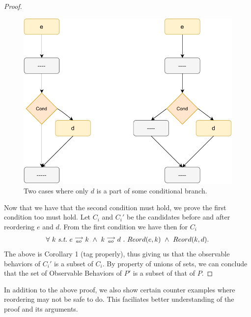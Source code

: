\begin{proof}
\begin{itemize}
                    \begin{figure}[H]
                        \centering 
                        \includegraphics[scale=0.7]{InstructionReordering/ConditionalsProofFig3.pdf}
                        \caption{Two cases where only $d$ is a part of some conditional branch.}
                    \end{figure}

            \end{itemize}

            Now that we have that the second condition must hold, we prove the first condition too must hold. Let $C_i$ and $C_i'$ be the candidates before and after reordering $e$ and $d$. From the first condition we have then for $C_i$
            \begin{align*}
                \forall \ k \ \textit{s.t.} \ 
                \reln{e}{ao}{k} \ \wedge \ \reln{k}{ao}{d} \ . \ 
                Reord(e,k) \ \wedge \ Reord(k,d).
            \end{align*}
            The above is Corollary 1 (tag properly), thus giving us that the observable behaviors of $C_i'$ is a subset of $C_i$. By property of unions of sets, we can conclude that the set of Observable Behaviors of $P'$ is a subset of that of $P$.

        \end{proof}

        In addition to the above proof, we also show certain counter examples where reordering may not be safe to do. This faciliates better understanding of the proof and its arguments.


